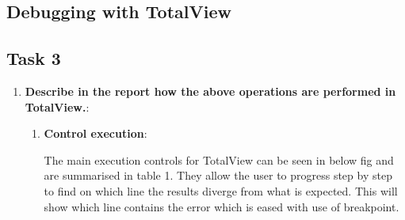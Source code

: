 \documentclass[10pt, letterpaper, twoside]{article}
\begin{document}
\begin{titlepage}
\section{Debugging with TotalView}

\subsection{Task 3}

\begin{enumerate}
\item \textbf{Describe in the report how the above operations are performed in TotalView.}:

\begin{enumerate}
\item \textbf{Control execution}:

The main execution controls for TotalView can be seen in below fig and are summarised in table 1. They allow the user to progress step by step to find on which line the results diverge from what is expected. This will show which line contains the error which is eased with use of breakpoint. \\


\end{enumerate}
\end{enumerate}
\end{titlepage}
\end{document}
